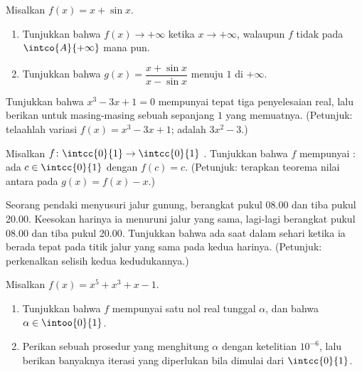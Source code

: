 \begin{exercise}[$\star\star$]\label{exo:g12:limcont:5}
Misalkan $f(x) = x + \sin x$.
\begin{enumerate}
  \item Tunjukkan bahwa $f(x) \to +\infty$ ketika $x \to +\infty$, walaupun
        $f$ tidak  pada  $\intco{A}{+\infty}$ mana pun.
  \item Tunjukkan bahwa $g(x) = \dfrac{x + \sin x}{x - \sin x}$ menuju $1$ di
        $+\infty$.
\end{enumerate}
\end{exercise}

\begin{exercise}[$\star\star$]\label{exo:g12:limcont:6}
Tunjukkan bahwa  $x^3 - 3x + 1 = 0$ mempunyai tepat tiga penyelesaian
real, lalu berikan untuk masing-masing sebuah  sepanjang $1$ yang
memuatnya. (Petunjuk: telaahlah variasi $f(x) = x^3 - 3x + 1$; 
adalah $3x^2 - 3$.)
\end{exercise}

\begin{exercise}[$\star\star$]\label{exo:g12:limcont:7}
Misalkan $f \colon \intcc{0}{1} \to \intcc{0}{1}$ . Tunjukkan bahwa $f$
mempunyai \emph{}: ada $c \in \intcc{0}{1}$ dengan $f(c) = c$.
(Petunjuk: terapkan teorema nilai antara pada $g(x) = f(x) - x$.)
\end{exercise}

\begin{exercise}[$\star\star\star$]\label{exo:g12:limcont:8}
Seorang pendaki menyusuri jalur gunung, berangkat pukul 08.00 dan tiba pukul
20.00. Keesokan harinya ia menuruni jalur yang sama, lagi-lagi berangkat pukul
08.00 dan tiba pukul 20.00. Tunjukkan bahwa ada saat dalam sehari ketika ia
berada tepat pada titik jalur yang sama pada kedua harinya. (Petunjuk:
perkenalkan selisih kedua  kedudukannya.)
\end{exercise}

\begin{exercise}[$\star\star\star$]\label{exo:g12:limcont:9}
Misalkan $f(x) = x^5 + x^3 + x - 1$.
\begin{enumerate}
  \item Tunjukkan bahwa $f$ mempunyai satu nol real tunggal $\alpha$, dan
        bahwa $\alpha \in \intoo{0}{1}$.
  \item Perikan sebuah prosedur  yang menghitung $\alpha$ dengan
        ketelitian $10^{-6}$, lalu berikan banyaknya iterasi yang diperlukan
        bila dimulai dari $\intcc{0}{1}$.
\end{enumerate}
\end{exercise}

